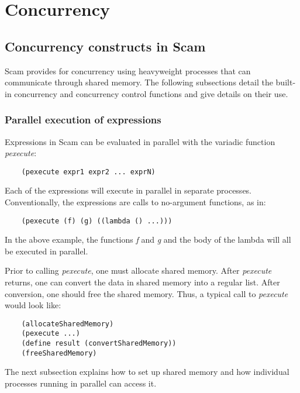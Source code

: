 \chapter{Concurrency}
\label{Concurrency}

\section{Concurrency constructs in Scam}

Scam provides for concurrency using heavyweight processes that
can communicate through shared memory. The following subsections
detail the built-in concurrency and concurrency control
functions and give details on
their use.

\subsection{Parallel execution of expressions}

Expressions in Scam can be evaluated in parallel with the variadic function
{\it pexecute}:

\begin{verbatim}
    (pexecute expr1 expr2 ... exprN)
\end{verbatim}

Each of the expressions will execute in parallel in separate processes.
Conventionally, the expressions are calls to no-argument functions, as in:

\begin{verbatim}
    (pexecute (f) (g) ((lambda () ...)))
\end{verbatim}

In the above example, the functions {\it f} and {\it g}
and the body of the lambda
will all be executed in parallel.

Prior to calling {\it pexecute}, one must allocate shared memory.
After {\it pexecute} returns, one can convert the data in shared memory into
a regular list. After conversion, one should free the shared memory.
Thus, a typical call to {\it pexecute} would look like:

\begin{verbatim}
    (allocateSharedMemory)
    (pexecute ...)
    (define result (convertSharedMemory))
    (freeSharedMemory)
\end{verbatim}
    
The next subsection explains how to set up shared
memory and how individual processes running in parallel can access
it.

